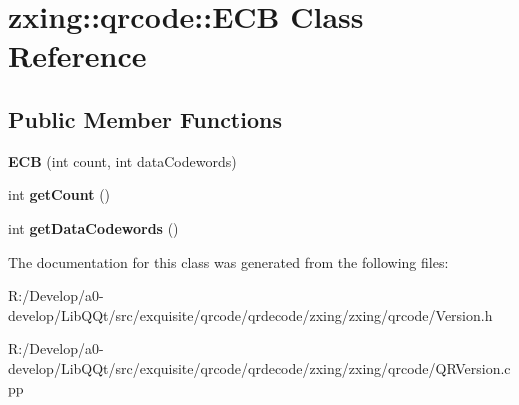 \hypertarget{classzxing_1_1qrcode_1_1_e_c_b}{}\section{zxing\+:\+:qrcode\+:\+:E\+CB Class Reference}
\label{classzxing_1_1qrcode_1_1_e_c_b}
\subsection*{Public Member Functions}
\begin{DoxyCompactItemize}
\item 
\mbox{\label{classzxing_1_1qrcode_1_1_e_c_b_aac62336964c60f1150a10a67ae765f6d}} 
{\bfseries E\+CB} (int count, int data\+Codewords)
\item 
\mbox{\label{classzxing_1_1qrcode_1_1_e_c_b_a979680df9b6e6fee0cd3a89c56546cfc}} 
int {\bfseries get\+Count} ()
\item 
\mbox{\label{classzxing_1_1qrcode_1_1_e_c_b_a4d5c9ee0930c4d25ae877d2c50faf19b}} 
int {\bfseries get\+Data\+Codewords} ()
\end{DoxyCompactItemize}


The documentation for this class was generated from the following files\+:\begin{DoxyCompactItemize}
\item 
R\+:/\+Develop/a0-\/develop/\+Lib\+Q\+Qt/src/exquisite/qrcode/qrdecode/zxing/zxing/qrcode/Version.\+h\item 
R\+:/\+Develop/a0-\/develop/\+Lib\+Q\+Qt/src/exquisite/qrcode/qrdecode/zxing/zxing/qrcode/Q\+R\+Version.\+cpp\end{DoxyCompactItemize}
